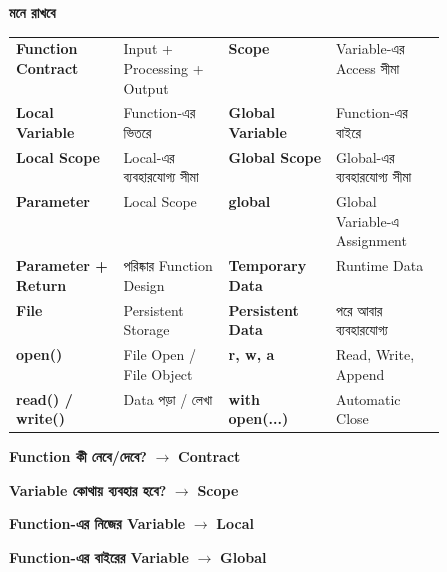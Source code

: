 \begin{rememberbox}

\textbf{\color{deepOrange}মনে রাখবে}

\begin{tabularx}
{\linewidth}
{
>{\bfseries\RaggedRight\arraybackslash}p{0.25\linewidth}
Y
>{\bfseries\RaggedRight\arraybackslash}p{0.25\linewidth}
Y
}

Function Contract
&
Input + Processing + Output
&
Scope
&
Variable-এর Access সীমা
\\[0.5mm]

Local Variable
&
Function-এর ভিতরে
&
Global Variable
&
Function-এর বাইরে
\\[0.5mm]

Local Scope
&
Local-এর ব্যবহারযোগ্য সীমা
&
Global Scope
&
Global-এর ব্যবহারযোগ্য সীমা
\\[0.5mm]

Parameter
&
Local Scope
&
\textenglish{\ttfamily global}
&
Global Variable-এ Assignment
\\[0.5mm]

Parameter + Return
&
পরিষ্কার Function Design
&
Temporary Data
&
Runtime Data
\\[0.5mm]

File
&
Persistent Storage
&
Persistent Data
&
পরে আবার ব্যবহারযোগ্য
\\[0.5mm]

\textenglish{\ttfamily open()}
&
File Open / File Object
&
\textenglish{\ttfamily r, w, a}
&
Read, Write, Append
\\[0.5mm]

\textenglish{\ttfamily read()} / \textenglish{\ttfamily write()}
&
Data পড়া / লেখা
&
\textenglish{\ttfamily with open(...)}
&
Automatic Close
\\

\end{tabularx}

\medskip

\begin{center}

\textbf{Function কী নেবে/দেবে?}
\(\longrightarrow\)
\textbf{Contract}

\qquad

\textbf{Variable কোথায় ব্যবহার হবে?}
\(\longrightarrow\)
\textbf{Scope}

\medskip

\textbf{Function-এর নিজের Variable}
\(\longrightarrow\)
\textbf{Local}

\qquad

\textbf{Function-এর বাইরের Variable}
\(\longrightarrow\)
\textbf{Global}


\end{center}
\end{rememberbox}
